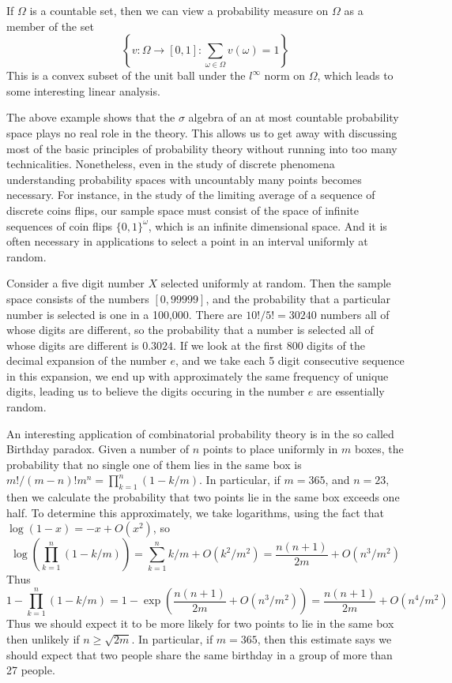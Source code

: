 \begin{example}
    If $\Omega$ is a countable set, then we can view a probability measure on $\Omega$ as a member of the set
    \[ \left\{ v: \Omega \to [0,1]: \sum_{\omega \in \Omega} v(\omega) = 1 \right\} \]
    This is a convex subset of the unit ball under the $l^\infty$ norm on $\Omega$, which leads to some interesting linear analysis.
\end{example}

The above example shows that the $\sigma$ algebra of an at most countable probability space plays no real role in the theory. This allows us to get away with discussing most of the basic principles of probability theory without running into too many technicalities. Nonetheless, even in the study of discrete phenomena understanding probability spaces with uncountably many points becomes necessary. For instance, in the study of the limiting average of a sequence of discrete coins flips, our sample space must consist of the space of infinite sequences of coin flips $\{ 0, 1 \}^\omega$, which is an infinite dimensional space. And it is often necessary in applications to select a point in an interval uniformly at random.

\begin{example}
    Consider a five digit number $X$ selected uniformly at random. Then the sample space consists of the numbers $[0,99999]$, and the probability that a particular number is selected is one in a 100,000. There are $10!/5! = 30240$ numbers all of whose digits are different, so the probability that a number is selected all of whose digits are different is $0.3024$. If we look at the first 800 digits of the decimal expansion of the number $e$, and we take each 5 digit consecutive sequence in this expansion, we end up with approximately the same frequency of unique digits, leading us to believe the digits occuring in the number $e$ are essentially random.
\end{example}

\begin{example}
    An interesting application of combinatorial probability theory is in the so called Birthday paradox. Given a number of $n$ points to place uniformly in $m$ boxes, the probability that no single one of them lies in the same box is $m!/(m-n)!m^n = \prod_{k = 1}^n (1 - k/m)$. In particular, if $m = 365$, and $n = 23$, then we calculate the probability that two points lie in the same box exceeds one half. To determine this approximately, we take logarithms, using the fact that $\log(1 - x) = -x + O(x^2)$, so
    \[ \log \left( \prod_{k = 1}^n (1 - k/m) \right) = \sum_{k = 1}^n k/m + O(k^2/m^2) = \frac{n(n+1)}{2m} + O(n^3/m^2) \]
    Thus
    \[ 1 - \prod_{k = 1}^n (1 - k/m) = 1 - \exp \left( \frac{n(n+1)}{2m} + O(n^3/m^2) \right) = \frac{n(n+1)}{2m} + O(n^4/m^2) \]
    Thus we should expect it to be more likely for two points to lie in the same box then unlikely if $n \geq \sqrt{2m}$. In particular, if $m = 365$, then this estimate says we should expect that two people share the same birthday in a group of more than 27 people.
\end{example}

